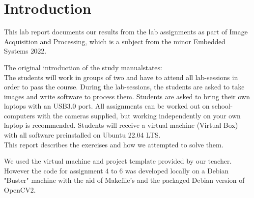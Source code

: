 \section{Introduction}
\label{sec:introduction}

This lab report documents our results from the lab assignments as part of Image Acquisition and Processing, which is a subject from the minor Embedded Systems 2022.

The original introduction of the study manual\cite{Lab_Assignments}states: \\

The students will work in groups of two and have to attend all lab-sessions in order to pass the course.
During the lab-sessions, the students are asked to take images and write software to process them.
Students are asked to bring their own laptops with an USB3.0 port. All assignments can be worked out on school-computers with the cameras supplied, but working independently on your own laptop is recommended. Students will receive a virtual machine (Virtual Box) with all software preinstalled on Ubuntu 22.04 LTS. \\

This report describes the exercises and how we attempted to solve them.

We used the virtual machine and project template provided by our teacher. However the code for assignment 4 to 6 was developed locally on a Debian "Buster" machine with the aid of Makefile's and the packaged Debian version of OpenCV2.
